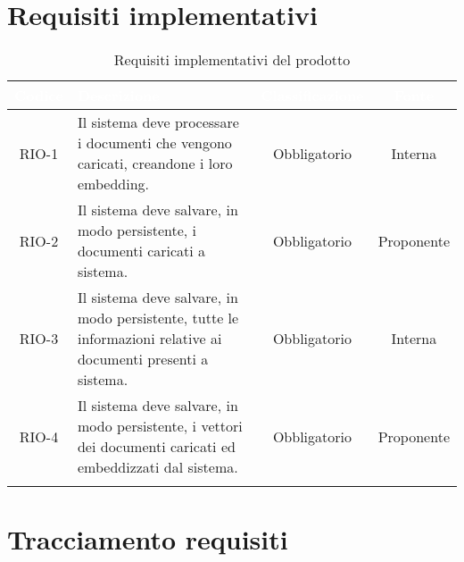 \section{Requisiti implementativi}
\begingroup
\setlength{\tabcolsep}{10pt}
\renewcommand{\arraystretch}{1.5}
\begin{xltabular}{\textwidth}{| c | X | c | c |}
    \hline
     \textbf{\textcolor{white}{Codice}} & \textbf{\textcolor{white}{Descrizione}} & \textbf{\textcolor{white}{Classificazione}} & \textbf{\textcolor{white}{Fonte}}\\
    \hline
    \endhead
    RIO-1 & Il sistema deve processare i documenti che vengono caricati, creandone i loro embedding. & Obbligatorio & Interna\\
    \hline
    RIO-2 & Il sistema deve salvare, in modo persistente, i documenti caricati a sistema. & Obbligatorio & Proponente\\
    \hline
    RIO-3 & Il sistema deve salvare, in modo persistente, tutte le informazioni relative ai documenti presenti a sistema. & Obbligatorio & Interna\\
    \hline
    RIO-4 & Il sistema deve salvare, in modo persistente, i vettori dei documenti caricati ed embeddizzati dal sistema. & Obbligatorio & Proponente\\
    \hline
    
     \caption{Requisiti implementativi del prodotto}
    \label{tab:reqimp}
\end{xltabular}
\endgroup

\section{Tracciamento requisiti}

